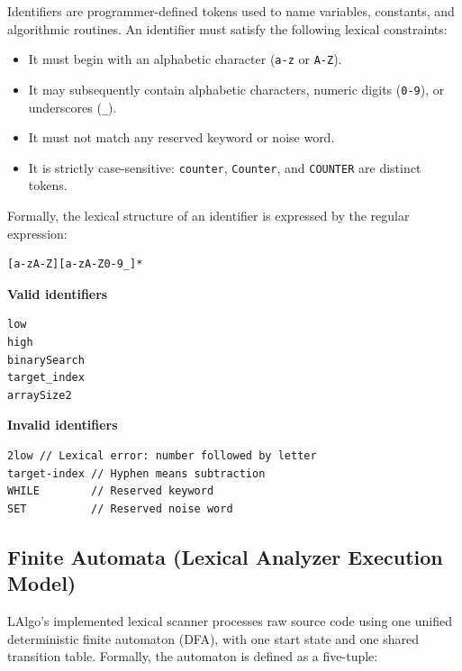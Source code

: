 \documentclass[11pt,a4paper]{article}
\newcommand{\codeinline}[1]{\texttt{#1}}
\begin{document}
Identifiers are programmer-defined tokens used to name variables, constants, and algorithmic routines. An identifier must satisfy the following lexical constraints:

\begin{itemize}
  \item It must begin with an alphabetic character (\codeinline{a-z} or \codeinline{A-Z}).
  \item It may subsequently contain alphabetic characters, numeric digits (\codeinline{0-9}), or underscores (\codeinline{\_}).
  \item It must not match any reserved keyword or noise word.
  \item It is strictly case-sensitive: \codeinline{counter}, \codeinline{Counter}, and \codeinline{COUNTER} are distinct tokens.
\end{itemize}

Formally, the lexical structure of an identifier is expressed by the regular expression:

\begin{lstlisting}[language={},basicstyle=\normalsize\ttfamily]
[a-zA-Z][a-zA-Z0-9_]*
\end{lstlisting}

\begin{minipage}[t]{0.47\linewidth}
\textbf{Valid identifiers}
\begin{lstlisting}[language={}]
low
high
binarySearch
target_index
arraySize2
\end{lstlisting}
\end{minipage}\hfill
\begin{minipage}[t]{0.50\linewidth}
\textbf{Invalid identifiers}
\begin{lstlisting}[language={},breaklines=true]
2low // Lexical error: number followed by letter
target-index // Hyphen means subtraction
WHILE        // Reserved keyword
SET          // Reserved noise word
\end{lstlisting}
\end{minipage}

\subsection{Finite Automata (Lexical Analyzer Execution Model)}

LAlgo's implemented lexical scanner processes raw source code using one unified deterministic finite automaton (DFA), with one start state and one shared transition table. Formally, the automaton is defined as a five-tuple:
\end{document}

